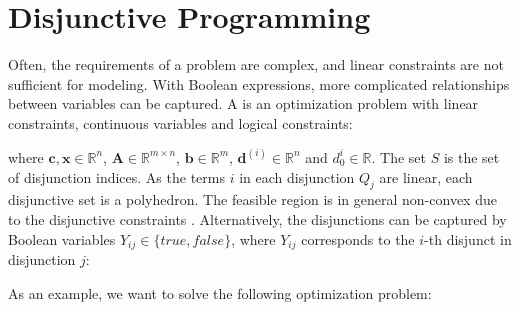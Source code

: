 \newpage
\section{Disjunctive Programming}
Often, the requirements of a problem are complex, and linear constraints are not sufficient for modeling. With Boolean expressions, more complicated relationships between variables can be captured. %
A  is an optimization problem with linear constraints, continuous variables and logical constraints:
 where $\mathbf c, \mathbf x \in \mathbb{R}^n$, $ \mathbf A \in \mathbb{R}^{m \times n}$, $\mathbf b \in \mathbb{R}^m$, $\mathbf d^{(i)} \in \mathbb{R}^n$ and $d_{0}^i \in \mathbb{R}$. The set $S$ is the set of disjunction indices.
As the terms $i$ in each disjunction $Q_j$ are linear, each disjunctive set is a polyhedron. The feasible region is in general non-convex due to the disjunctive constraints \cite{balas_disjunctive_2018}. 
Alternatively, the disjunctions can be captured by Boolean variables $Y_{ij} \in \{true, false \}$, where $Y_{ij}$ corresponds to the $i$-th disjunct in disjunction $j$:

As an example, we want to solve the following optimization problem:

